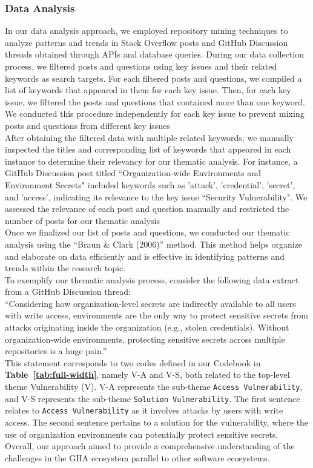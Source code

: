 \documentclass[conference]{IEEEtran}
\begin{document}
            \subsubsection{\textbf{Data Analysis}}
                In our data analysis approach, we employed repository mining techniques to analyze patterns and trends in Stack Overflow posts and GitHub Discussion threads obtained through APIs and database queries. During our data collection process, we filtered posts and questions using key issues and their related keywords as search targets. For each filtered posts and questions, we compiled a list of keywords that appeared in them for each key issue. Then, for each key issue, we filtered the posts and questions that contained more than one keyword. We conducted this procedure independently for each key issue to prevent mixing posts and questions from different key issues \\
               After obtaining the filtered data with multiple related keywords, we manually inspected the titles and corresponding list of keywords that appeared in each instance to determine their relevancy for our thematic analysis. For instance, a GitHub Discussion post titled “Organization-wide Environments and Environment Secrets" included keywords such as 'attack', 'credential', 'secret', and 'access', indicating its relevance to the key issue “Security Vulnerability". We assessed the relevance of each post and question manually and restricted the number of posts for our thematic analysis\\
	Once we finalized our list of posts and questions, we conducted our thematic analysis using the “Braun \& Clark (2006)” method. This method helps organize and elaborate on data efficiently and is effective in identifying patterns and trends within the research topic.\\
To exemplify our thematic analysis process, consider the following data extract from a GitHub Discussion thread:\\
“Considering how organization-level secrets are indirectly available to all users with write access, environments are the only way to protect sensitive secrets from attacks originating inside the organization (e.g., stolen credentials). Without organization-wide environments, protecting sensitive secrets across multiple repositories is a huge pain.”\\
This statement corresponds to two codes defined in our Codebook in \textbf{Table~\ref{tab:full-width}}, namely V-A and V-S, both related to the top-level theme Vulnerability (V). V-A represents the sub-theme \texttt{Access Vulnerability}, and V-S represents the sub-theme \texttt{Solution Vulnerability}. The first sentence relates to \texttt{Access Vulnerability} as it involves attacks by users with write access. The second sentence pertains to a solution for the vulnerability, where the use of organization environments can potentially protect sensitive secrets. Overall, our approach aimed to provide a comprehensive understanding of the challenges in the GHA ecosystem parallel to other software ecosystems.\\
\end{document}

